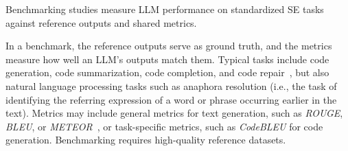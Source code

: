 \label{sec:benchmarking-llms-for-software-engineering-tasks}

Benchmarking studies measure LLM performance on standardized SE tasks against reference outputs and shared metrics.


In a benchmark, the reference outputs serve as ground truth, and the metrics measure how well an LLM's outputs match them. Typical tasks include code generation, code summarization, code completion, and code repair~\cite{yang2025code}, but also natural language processing tasks such as anaphora resolution (i.e., the task of identifying the referring expression of a word or phrase occurring earlier in the text). %
Metrics may include general metrics for text generation, such as \emph{ROUGE}, \emph{BLEU}, or \emph{METEOR}~\cite{DBLP:journals/tosem/HouZLYWLLLGW24}, or task-specific metrics, such as \emph{CodeBLEU} for code generation. Benchmarking requires high-quality reference datasets.


